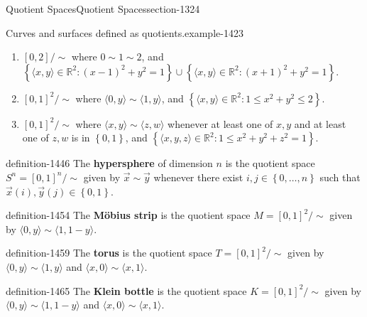 \documentclass[oneside,10pt,]{article}
\newcommand{\terminology}[1]{\textbf{#1}}
\newcommand{\tuple}[1]{\langle #1 \rangle}
\newcommand{\mb}{\mathbb}
\newcommand{\setBuilder}[2]{\left\{#1:#2\right\}}
\newcommand{\setList}[1]{\left\{#1\right\}}
\begin{document}
\begin{sectionptx}{Quotient Spaces}{}{Quotient Spaces}{}{}{section-1324}
\begin{example}{Curves and surfaces defined as quotients.}{example-1423}
\begin{enumerate}
\item\hypertarget{li-1431}{}\([0,2]/\sim\) where \(0\sim 1\sim 2\), and \(\setBuilder{\tuple{x,y}\in\mb R^2}{(x-1)^2+y^2=1}\cup\setBuilder{\tuple{x,y}\in\mb R^2}{(x+1)^2+y^2=1}\).%
\item\hypertarget{li-1435}{}\([0,1]^2/\sim\) where \(\tuple{0,y}\sim\tuple{1,y}\), and \(\setBuilder{\tuple{x,y}\in\mb R^2}{1\leq x^2+y^2\leq 2}\).%
\item\hypertarget{li-1439}{}\([0,1]^2/\sim\) where \(\tuple{x,y}\sim\tuple{z,w}\) whenever at least one of \(x,y\) and at least one of \(z,w\) is in \(\setList{0,1}\), and \(\setBuilder{\tuple{x,y,z}\in\mb R^2}{1\leq x^2+y^2+z^2=1}\).%
\end{enumerate}
\end{example}
\begin{definition}{}{definition-1446}%
\hypertarget{p-1447}{}%
The \terminology{hypersphere} of dimension \(n\) is the quotient space \(S^n=[0,1]^n/\sim\) given by \(\vec x\sim\vec y\) whenever there exist \(i,j\in\setList{0,\dots,n}\) such that \(\vec x(i),\vec y(j)\in\setList{0,1}\).%
\end{definition}
\begin{definition}{}{definition-1454}%
\hypertarget{p-1455}{}%
The \terminology{Möbius strip} is the quotient space \(M=[0,1]^2/\sim\) given by \(\tuple{0,y}\sim\tuple{1,1-y}\).%
\end{definition}
\begin{definition}{}{definition-1459}%
\hypertarget{p-1460}{}%
The \terminology{torus} is the quotient space \(T=[0,1]^2/\sim\) given by \(\tuple{0,y}\sim\tuple{1,y}\) and \(\tuple{x,0}\sim\tuple{x,1}\).%
\end{definition}
\begin{definition}{}{definition-1465}%
\hypertarget{p-1466}{}%
The \terminology{Klein bottle} is the quotient space \(K=[0,1]^2/\sim\) given by \(\tuple{0,y}\sim\tuple{1,1-y}\) and \(\tuple{x,0}\sim\tuple{x,1}\).%
\end{definition}
\end{sectionptx}
%
%
\typeout{************************************************}
\typeout{************************************************}
%
%
\appendix
%
\end{document}
